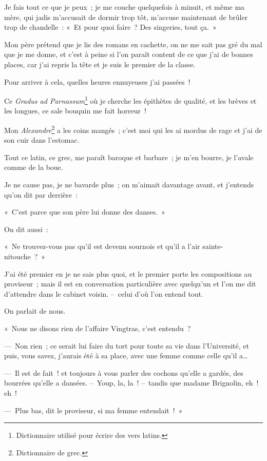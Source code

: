 \documentclass[french,twoside]{book} %
\begin{document}
Je fais tout ce que je peux ; je me couche quelquefois à minuit, et même ma mère, qui jadis m’accusait de dormir trop tôt, m’accuse maintenant de brûler trop de chandelle : « Et pour quoi faire ? Des singeries, tout ça. »\par
Mon père prétend que je lis des romans en cachette, on ne me sait pas gré du mal que je me donne, et c’est à peine si l’on paraît content de ce que j’ai de bonnes places, car j’ai repris la tête et je suis le premier de la classe.\par
Pour arriver à cela, quelles heures ennuyeuses j’ai passées !\par
Ce \emph{Gradus ad Parnassum}\footnote{Dictionnaire utilisé pour écrire des vers latins.} où je cherche les épithètes de qualité, et les brèves et les longues, ce sale bouquin me fait horreur !\par
Mon \emph{Alexandre}\footnote{Dictionnaire de grec.} a les coins mangés ; c’est moi qui les ai mordus de rage et j’ai de son cuir dans l’estomac.\par
Tout ce latin, ce grec, me paraît baroque et barbare ; je m’en bourre, je l’avale comme de la boue.\par
Je ne cause pas, je ne bavarde plus ; on m’aimait davantage avant, et j’entends qu’on dit par derrière :\par
« C’est parce que son père lui donne des danses. »\par
On dit aussi :\par
« Ne trouvez-vous pas qu’il est devenu sournois et qu’il a l’air sainte-nitouche ? »\par
\bigbreak
\noindent J’ai été premier en je ne sais plus quoi, et le premier porte les compositions au proviseur ; mais il est en conversation particulière avec quelqu’un et l’on me dit d’attendre dans le cabinet voisin. – celui d’où l’on entend tout.\par
On parlait de nous.\par
« Nous ne disons rien de l’affaire Vingtras, c’est entendu ?\par
— Non rien ; ce serait lui faire du tort pour toute sa vie dans l’Université, et puis, vous savez, j’aurais été à sa place, avec une femme comme celle qu’il a…\par
— Il est de fait ! et toujours à vous parler des cochons qu’elle a gardés, des bourrées qu’elle a dansées. – Youp, la, la ! – tandis que madame Brignolin, eh ! eh !\par
— Plus bas, dit le proviseur, si ma femme entendait ! »\par
\end{document}
